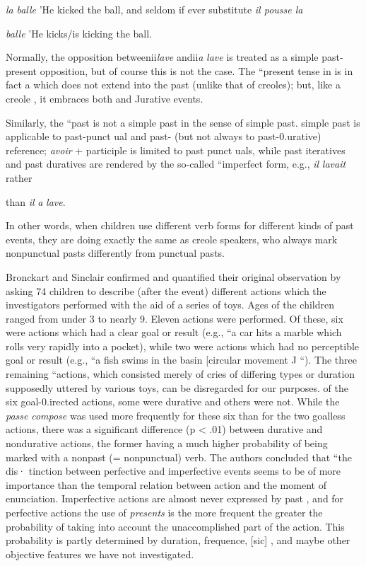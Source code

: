 \textit{la} \textit{balle }'He kicked the ball, and seldom if ever substitute \textit{il pousse la}

\textit{balle} 'He kicks/is kicking the ball.

Normally, the opposition betweenii\textit{lave} andii\textit{a} \textit{lave }is treated as a simple past-present opposition, but of course this is not the case. The ``present tense in  is in fact a  which does not extend into the past (unlike that of creoles); but, like a creole , it embraces both  and Jurative events.


Similarly, the ``past is not a simple past in the sense of  simple past.  simple past is applicable to past-punct ual and past- (but not always to past-0.urative) reference;  \textit{avoir} + participle is limited to past punct uals, while past iteratives and past duratives are rendered by the so-called ``imperfect form, e.g., \textit{il} \textit{lavait} rather

than \textit{il} \textit{a} \textit{lave}.

In other words, when  children use different verb forms for different kinds of past events, they are doing exactly the same as creole speakers, who always mark nonpunctual pasts differently from
punctual pasts.

Bronckart and Sinclair confirmed and quantified their original observation by asking 74 children to describe (after the event) different  actions which the investigators performed with the aid of a series of toys. Ages of the children ranged from under 3 to nearly 9. Eleven actions were performed. Of these, six were actions which had a clear goal or result (e.g., ``a car hits a marble which rolls very rapidly into a pocket{\textquotedbl}), while two were actions which had no perceptible goal
or result (e.g., ``a fish swims in the basin [circular movement J ``). The
three remaining ``actions, which consisted merely of cries of differing types or duration supposedly uttered by various toys, can be disre\-garded for our purposes.
of the six goal-0.irected actions, some were durative and others
were not. While the  \textit{passe} \textit{compose} was used more frequently for these six than for the two goalless actions, there was a significant
difference (p {\textless} .01) between durative and nondurative actions, the
former having a much higher probability of being marked with a nonpast (= nonpunctual) verb. The authors concluded that ``the dis· tinction between perfective and imperfective events seems to be of more importance than the temporal relation between action and the moment of enunciation. Imperfective actions are almost never ex\-pressed by past , and for perfective actions the use of \textit{presents}
is the more frequent the greater the probability of taking into account the unaccomplished part of the action. This probability is partly determined by duration, frequence, [sic] , and maybe other objective features we have not investigated.{\textquotedbl}

